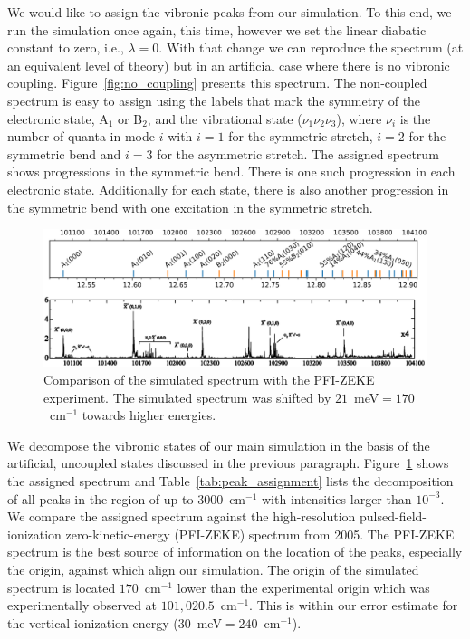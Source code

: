 \documentclass[
12pt,
a4paper,
prb,
superscriptaddress,
tightenlines,  %
]{revtex4}
\begin{document}
We would like to assign the vibronic peaks from our simulation. To this end,
we run the simulation once again, this time, however we set the linear
diabatic constant to zero, i.e., $\lambda = 0$. With that change we can
reproduce the spectrum (at an equivalent level of theory) but in an artificial
case where there is no vibronic coupling. Figure~\ref{fig:no_coupling}
presents this spectrum. The non-coupled spectrum is easy to assign using the
labels that mark the symmetry of the electronic state, A$_1$ or B$_2$, and the
vibrational state ($\nu _1 \nu_2 \nu_3$), where $\nu _i$ is the number of
quanta in mode $i$ with $i=1$ for the symmetric stretch, $i=2$ for the
symmetric bend and $i=3$ for the asymmetric stretch. The assigned spectrum
shows progressions in the symmetric bend. There is one such progression in
each electronic state.  Additionally for each state, there is also another
progression in the symmetric bend with one excitation in the symmetric
stretch.

\begin{figure}
    \includegraphics[width=16 cm]{./figures/sim_vs_zeke}
    \caption{
        Comparison of the simulated spectrum with the PFI-ZEKE
        experiment.\cite{Willitsch:O3ZEKE:2005} The simulated spectrum was
        shifted by $21$~meV$ = 170$~cm$^{-1}$ towards higher energies.
    }
    \label{fig:sim_vs_zeke}
\end{figure}

We decompose the vibronic states of our main simulation in the basis of the
artificial, uncoupled states discussed in the previous paragraph.
Figure~\ref{fig:sim_vs_zeke} shows the assigned spectrum and
Table~\ref{tab:peak_assignment} lists the decomposition of all peaks in the
region of up to $3000$~cm$^{-1}$ with intensities larger than $10^{-3}$. We
compare the assigned spectrum against the high-resolution
pulsed-field-ionization zero-kinetic-energy (PFI-ZEKE) spectrum from
2005.\cite{Willitsch:O3ZEKE:2005} The PFI-ZEKE spectrum is the best source of
information on the location of the peaks, especially the origin, against which
align our simulation. The origin of the simulated spectrum is located
$170$~cm$^{-1}$ lower than the experimental origin which was experimentally
observed at $101,020.5$~cm$^{-1}$.\cite{Willitsch:O3ZEKE:2005} This is within
our error estimate for the vertical ionization energy
($30$~meV$=240$~cm$^{-1}$).  
\end{document}

